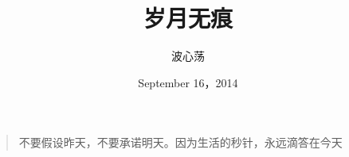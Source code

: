 \documentclass[11pt, a4paper]{book}
\begin{document}
\frontmatter
\renewcommand\contentsname{目录}
\title{岁月无痕}
\author{波心荡}
\date{September 16，2014}

\clearpage\maketitle
\thispagestyle{empty}

\vspace*{\fill} 
\begin{quote} 
\centering 
不要假设昨天，不要承诺明天。因为生活的秒针，永远滴答在今天
\end{quote}
\vspace*{\fill}
\newpage


\onehalfspacing
\addtolength{\parskip}{3pt}
\setlength{\parindent}{2em}

\singlespacing
\setlength{\parskip}{0pt}
\tableofcontents

\onehalfspacing
\addtolength{\parskip}{3pt}
\setlength{\parindent}{2em}



\singlespacing
\setlength{\parskip}{0pt}
\mainmatter
\onehalfspacing




\end{document}
